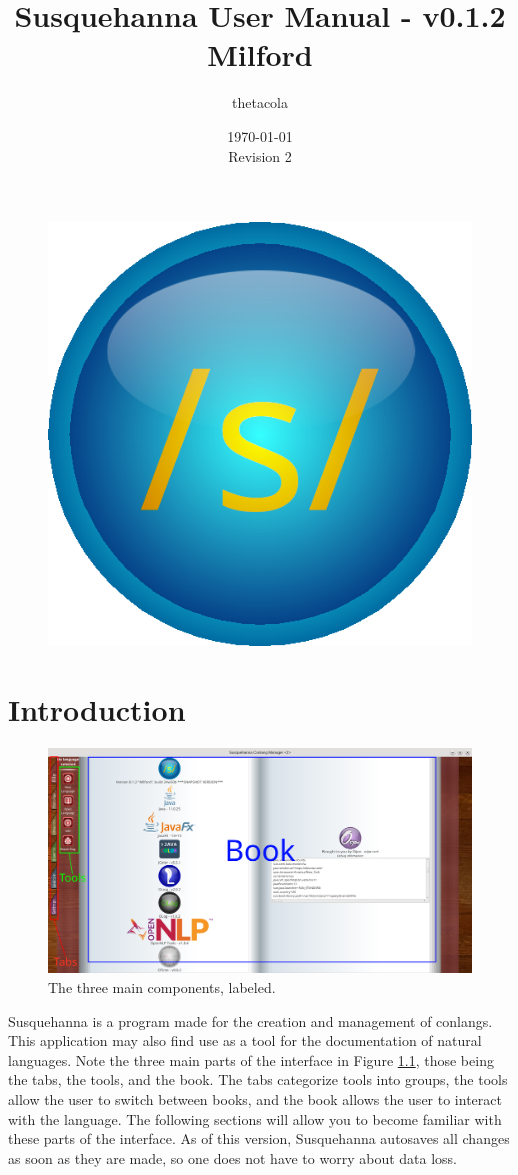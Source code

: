 \documentclass{report}
\title{Susquehanna User Manual - v0.1.2 Milford}
\date{\today\\Revision 2}
\author{thetacola}
\begin{document}
	\begin{figure}
		\centering
		\includegraphics[width=0.7\linewidth]{img/logo}
	\end{figure}
	\maketitle
	\tableofcontents
	\chapter{Introduction}
	\begin{figure}[ht]
		\centering
		\includegraphics[width=1\linewidth]{img/diagram}
		\caption{The three main components, labeled.}
		\label{fig:tabs-diagram-1}
	\end{figure}
	\par
	Susquehanna is a program made for the creation and management of conlangs. This application may also find use as a tool for the documentation of natural languages. Note the three main parts of the interface in Figure \ref{fig:tabs-diagram-1}, those being the tabs, the tools, and the book. The tabs categorize tools into groups, the tools allow the user to switch between books, and the book allows the user to interact with the language. The following sections will allow you to become familiar with these parts of the interface. As of this version, Susquehanna autosaves all changes as soon as they are made, so one does not have to worry about data loss.
\end{document}
